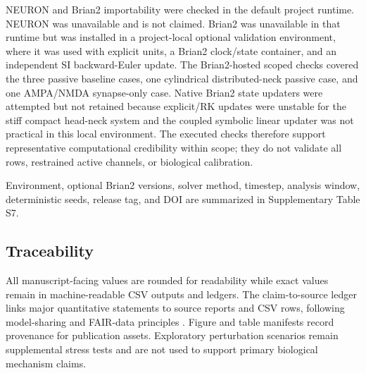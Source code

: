 NEURON and Brian2 importability were checked in the default project runtime. NEURON was unavailable and is not claimed. Brian2 was unavailable in that runtime but was installed in a project-local optional validation environment, where it was used with explicit units, a Brian2 clock/state container, and an independent SI backward-Euler update. The Brian2-hosted scoped checks covered the three passive baseline cases, one cylindrical distributed-neck passive case, and one AMPA/NMDA synapse-only case. Native Brian2 state updaters were attempted but not retained because explicit/RK updates were unstable for the stiff compact head-neck system and the coupled symbolic linear updater was not practical in this local environment. The executed checks therefore support representative computational credibility within scope; they do not validate all rows, restrained active channels, or biological calibration.

Environment, optional Brian2 versions, solver method, timestep, analysis window, deterministic seeds, release tag, and DOI are summarized in Supplementary Table S7.

\subsection{Traceability}

All manuscript-facing values are rounded for readability while exact values remain in machine-readable CSV outputs and ledgers. The claim-to-source ledger links major quantitative statements to source reports and CSV rows, following model-sharing and FAIR-data principles \citep{Hines2004ModelDB,Wilkinson2016FAIR}. Figure and table manifests record provenance for publication assets. Exploratory perturbation scenarios remain supplemental stress tests and are not used to support primary biological mechanism claims.
